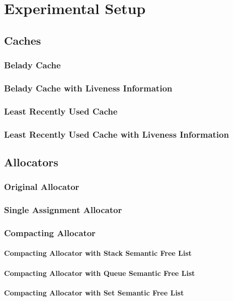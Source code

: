 \documentclass[onecolumn, openany, master, english, seal, signatures]{dbrgrptt}
\begin{document}
\chapter{Experimental Setup}

\section{Caches}\label{sec:caches}
\subsection{Belady Cache}
\subsection{Belady Cache with Liveness Information}
\subsection{Least Recently Used Cache}
\subsection{Least Recently Used Cache with Liveness Information}

\section{Allocators}
\subsection{Original Allocator}
\subsection{Single Assignment Allocator}
\subsection{Compacting Allocator}
\subsubsection{Compacting Allocator with Stack Semantic Free List}
\subsubsection{Compacting Allocator with Queue Semantic Free List}
\subsubsection{Compacting Allocator with Set Semantic Free List}
\end{document}

